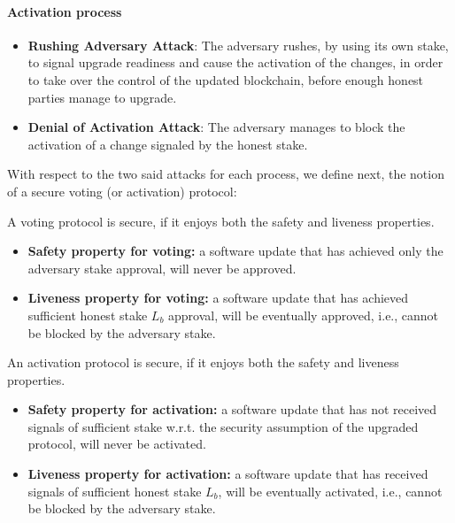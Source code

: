 \paragraph{Activation process}
\begin{itemize}
	\item \textbf{Rushing Adversary Attack}: The adversary rushes, by using its 
	own stake, to signal upgrade readiness and cause the activation of the 
	changes, in order to take over the control of the updated blockchain, 
	before enough honest parties manage to upgrade. 
	\item \textbf{Denial of Activation Attack}: The 
	adversary manages to block the activation of a change signaled by the 
	honest stake.
\end{itemize}


With respect to the two said attacks for each process, we define next, the 
notion of a secure voting (or activation) protocol:
\begin{definition}\label{def:liveness_safety_voting}
	A voting protocol is secure, if it enjoys both the safety 
	and liveness properties.
	
	\begin{itemize}
		\item \textbf{Safety property for voting:} a software update that has 
		achieved 
		only the adversary stake approval, will never be approved.
		
		\item \textbf{Liveness property for voting:} a software update that has 
		achieved 
		sufficient honest stake $L_b$ approval, will be eventually approved, 
		i.e., cannot be blocked by the adversary stake.		
	\end{itemize}	
\end{definition}


\begin{definition}\label{def:liveness_safety_activation}
	An activation protocol is secure, if it enjoys both the safety 
	and liveness properties.
	
	\begin{itemize}
		\item \textbf{Safety property for activation:} a software update that 
		has not received signals of sufficient  stake w.r.t. the 
		security assumption of the upgraded protocol, will never be activated.
		
		\item \textbf{Liveness property for activation:} a software update that 
		has received
		signals of sufficient honest stake $L_b$, will be eventually activated, 
		i.e., cannot be blocked by the adversary stake.		
	\end{itemize}	
\end{definition}

